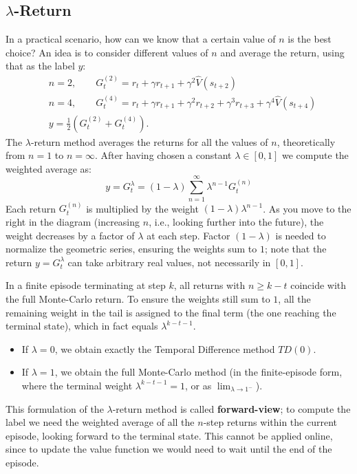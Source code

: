 \documentclass[10pt, a4paper]{report}
\begin{document}
\subsection{$\lambda$-Return}
In a practical scenario, how can we know that a certain value of $n$ is the best choice? An idea is to consider different values of $n$ and average the return, using that as the label $y$:
\begin{align}
    &n=2,\qquad G_t^{(2)}=r_t+\gamma r_{t+1}+\gamma^2 \hat V(s_{t+2}) \\
    &n=4,\qquad G_t^{(4)}=r_t+\gamma r_{t+1}+\gamma^2 r_{t+2}+\gamma^3r_{t+3}+\gamma^4\hat V(s_{t+4})\\
    &y=\frac{1}{2}\left(G_t^{(2)}+G_t^{(4)}\right).
\end{align}
The $\lambda$-return method averages the returns for all the values of $n$, theoretically from $n=1$ to $n=\infty$. After having chosen a constant $\lambda\in[0,1]$ we compute the weighted average as:\begin{equation}
    \boxed{y = G_t^\lambda = (1-\lambda)\sum_{n=1}^{\infty} \lambda^{n-1} G_t^{(n)}}
\end{equation}
Each return $G_t^{(n)}$ is multiplied by the weight $(1-\lambda)\lambda^{n-1}$. As you move to the right in the diagram (increasing $n$, i.e., looking further into the future), the weight decreases by a factor of $\lambda$ at each step. Factor $(1-\lambda)$ is needed to normalize the geometric series, ensuring the weights sum to $1$; note that the return $y = G_t^\lambda$ can take arbitrary real values, not necessarily in $[0,1]$.\bigskip 

In a finite episode terminating at step $k$, all returns with $n \ge k-t$ coincide with the full Monte-Carlo return. To ensure the weights still sum to $1$, all the remaining weight in the tail is assigned to the final term (the one reaching the terminal state), which in fact equals $\lambda^{k-t-1}$.\begin{itemize}
    \item If $\lambda =0$, we obtain exactly the Temporal Difference method $TD(0)$.
    \item If $\lambda=1$, we obtain the full Monte-Carlo method (in the finite-episode form, where the terminal weight $\lambda^{k-t-1} = 1$, or as $\lim_{\lambda \to 1^-}$).
\end{itemize}
This formulation of the $\lambda$-return method is called \textbf{forward-view}; to compute the label we need the weighted average of all the $n$-step returns within the current episode, looking forward to the terminal state. This cannot be applied online, since to update the value function we would need to wait until the end of the episode.
\end{document}
